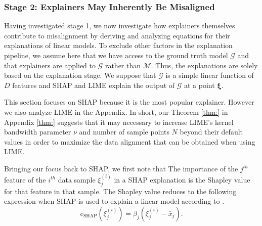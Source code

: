 \documentclass[mnsc,blindrev]{informs3}
\newcommand{\bI}{\mathbf{I}}
\begin{document}
    \subsubsection{Stage 2: Explainers May Inherently Be Misaligned}
    \label{sec:theoretical_considerations}
   Having investigated stage 1, we now investigate how explainers themselves contribute to misalignment by deriving and analyzing equations for their explanations of linear models. To exclude other factors in the explanation pipeline, we assume here that we have access to the ground truth model $\mathcal{G}$ and that explainers are applied to $\mathcal{G}$ rather than $\mathcal{M}$. Thus, the explanations are solely based on the explanation stage. We suppose that $\mathcal{G}$ is a simple linear function of $D$ features and SHAP and LIME explain the output of $\mathcal{G}$ at a point $\boldsymbol{\xi}$.%

  This section focuses on SHAP because it is the most popular explainer. However we also analyze LIME in the Appendix. In short, our Theorem \ref{thm:} in Appendix \ref{thm:} suggests that it may necessary to increase LIME's kernel bandwidth parameter $\nu$ and number of sample points $N$ beyond their default values in order to maximize the data alignment that can be obtained when using LIME. 

              Bringing our focus back to SHAP, we first note that The importance of the $j^{th}$ feature of the $i^{th}$ data sample $\xi^{(i)}_j$ in a SHAP explanation is the Shapley value for that feature in that sample. The Shapley value reduces to the following expression when SHAP is used to explain a linear model according to \cite{StrumbeljErik2014Epma,lundberg17shap}. 
             \begin{equation}
                \label{eqn:shap_gt}
                e_\text{SHAP}(\xi^{(i)}_j) = \beta_j (\xi^{(i)}_j - \bar{x}_j).
             \end{equation}
\end{document}
